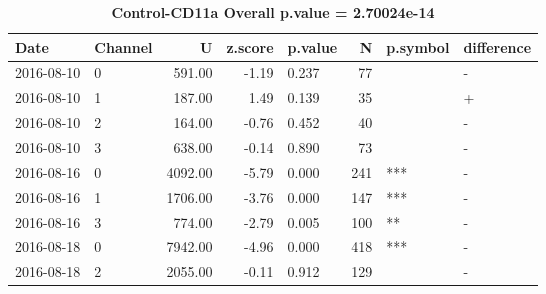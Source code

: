 \begin{table}[ht]
\caption[Control-CD11a]{\textbf{Control-CD11a Overall p.value = 2.70024e-14}}
\centering
\begin{tabular}{llrrlrll}
  \hline
Date & Channel & U & z.score & p.value & N & p.symbol & difference \\ 
  \hline
2016-08-10 & 0 & 591.00 & -1.19 & 0.237 &  77 &  & - \\ 
  2016-08-10 & 1 & 187.00 & 1.49 & 0.139 &  35 &  & + \\ 
  2016-08-10 & 2 & 164.00 & -0.76 & 0.452 &  40 &  & - \\ 
  2016-08-10 & 3 & 638.00 & -0.14 & 0.890 &  73 &  & - \\ 
  2016-08-16 & 0 & 4092.00 & -5.79 & 0.000 & 241 & *** & - \\ 
  2016-08-16 & 1 & 1706.00 & -3.76 & 0.000 & 147 & *** & - \\ 
  2016-08-16 & 3 & 774.00 & -2.79 & 0.005 & 100 & ** & - \\ 
  2016-08-18 & 0 & 7942.00 & -4.96 & 0.000 & 418 & *** & - \\ 
  2016-08-18 & 2 & 2055.00 & -0.11 & 0.912 & 129 &  & - \\ 
   \hline
\end{tabular}
\end{table}
